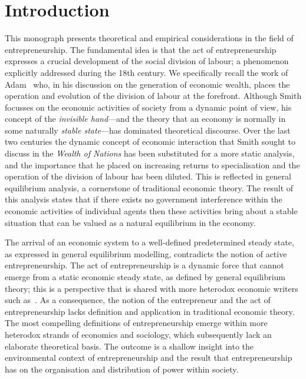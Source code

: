 \setcounter{page}{1} 
\chapter{Introduction}

This monograph presents theoretical and empirical considerations in the field of entrepreneurship. The fundamental idea is that the act of entrepreneurship expresses a crucial development of the social division of labour; a phenomenon explicitly addressed during the 18th century. We specifically recall the work of Adam~\citet{Smith1776} who, in his discussion on the generation of economic wealth, places the operation and evolution of the division of labour at the forefront. Although Smith focusses on the economic activities of society from a dynamic point of view, his concept of the \emph{invisible hand}---and the theory that an economy is normally in some naturally \emph{stable state}---has dominated theoretical discourse. Over the last two centuries the dynamic concept of economic interaction that Smith sought to discuss in the \emph{Wealth of Nations} has been substituted for a more static analysis, and the importance that he placed on increasing returns to specialisation and the operation of the division of labour has been diluted. This is reflected in general equilibrium analysis, a cornerstone of traditional economic theory. The result of this analysis states that if there exists no government interference within the economic activities of individual agents then these activities bring about a stable situation that can be valued as a natural equilibrium in the economy.

The arrival of an economic system to a well-defined predetermined steady state, as expressed in general equilibrium modelling, contradicts the notion of active entrepreneurship. The act of entrepreneurship is a dynamic force that cannot emerge from a static economic steady state, as defined by general equilibrium theory; this is a perspective that is shared with more heterodox economic writers such as~\citet{Schumpeter1942}. As a consequence, the notion of the entrepreneur and the act of entrepreneurship lacks definition and application in traditional economic theory. The most compelling definitions of entrepreneurship emerge within more heterodox strands of economics and sociology, which subsequently lack an elaborate theoretical basis. The outcome is a shallow insight into the environmental context of entrepreneurship and the result that entrepreneurship has on the organisation and distribution of power within society.

